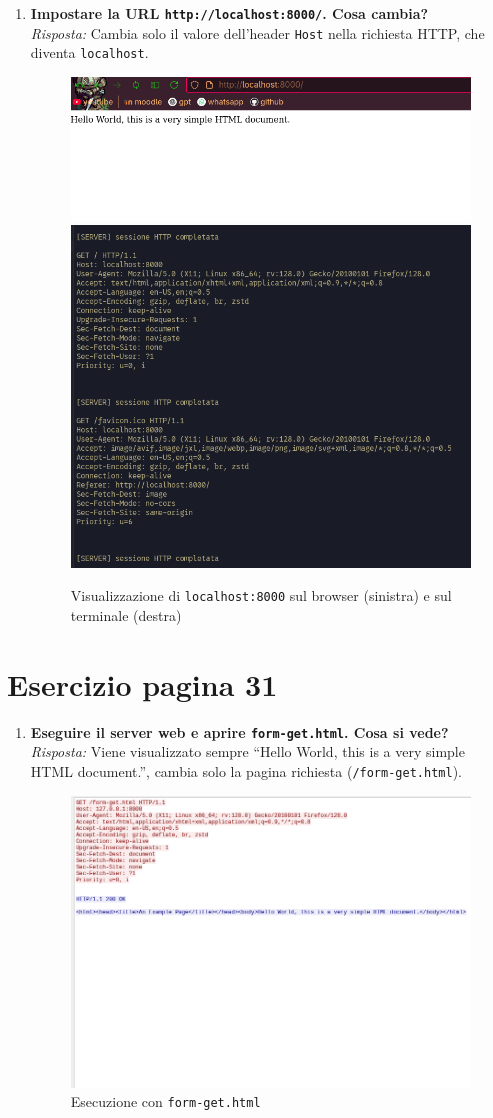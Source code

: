 \documentclass[a4paper,12pt]{article}
\begin{document}
\begin{enumerate}
  \item \textbf{Impostare la URL \texttt{http://localhost:8000/}. Cosa cambia?}\\
    \emph{Risposta:} Cambia solo il valore dell'header \texttt{Host} nella richiesta HTTP, che diventa \texttt{localhost}.
    \begin{figure}[h]
      \centering
      \includegraphics[width=0.45\linewidth]{browser2.png}
      \includegraphics[width=0.45\linewidth]{terminale2.png}
      \caption{Visualizzazione di \texttt{localhost:8000} sul browser (sinistra) e sul terminale (destra)}
    \end{figure}
\end{enumerate}

\section*{Esercizio pagina 31}
\begin{enumerate}
  \item \textbf{Eseguire il server web e aprire \texttt{form-get.html}. Cosa si vede?}\\
    \emph{Risposta:} Viene visualizzato sempre ``Hello World, this is a very simple HTML document.'', cambia solo la pagina richiesta (\texttt{/form-get.html}).
    \begin{figure}[h]
      \centering
      \includegraphics[width=0.7\linewidth]{form-get.png}
      \caption{Esecuzione con \texttt{form-get.html}}
    \end{figure}
\end{enumerate}
\end{document}

